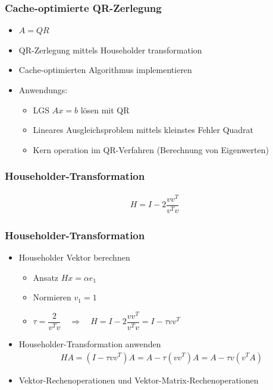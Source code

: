 \begin{frame}
\frametitle{Cache-optimierte QR-Zerlegung}
\vspace{-.6cm}
\begin{itemize}
	\item $ A = QR $
	
	\item QR-Zerlegung mittels Householder transformation
	\item Cache-optimierten Algorithmus implementieren
	\item Anwendungs:
	\begin{itemize}
		\item LGS $ Ax = b $ lösen mit QR
		\item Lineares Ausgleichsproblem mittels kleinstes Fehler Quadrat
		\item Kern operation im QR-Verfahren (Berechnung von Eigenwerten)
	\end{itemize}
\end{itemize}

\end{frame}

\begin{frame}
	\frametitle{Householder-Transformation}
	\vspace{-1cm}
	\begin{align*}
		H = I - 2 \dfrac{vv^T}{v^Tv}
	\end{align*}
	\centering
	\scalebox{.8}{}

\end{frame}

\begin{frame}
	\frametitle{Householder-Transformation}
	\vspace{-1cm}
	\begin{itemize}
	\item Householder Vektor berechnen\\
		\begin{itemize}
			\item Ansatz $ Hx = \alpha e_1 $
			\item Normieren $ v_1 = 1 $
			\item $ \tau = \dfrac{2}{v^Tv} \quad \Longrightarrow \quad H = I - 2 \dfrac{vv^T}{v^Tv} = I - \tau vv^T$
		\end{itemize}
		

	\item  Householder-Transformation anwenden
		\begin{align*} 
		H A =(I - \tau vv^T) A= A - \tau (vv^T )A = A - \tau v(v^TA)
		\end{align*}
	\item  Vektor-Rechenoperationen und Vektor-Matrix-Rechenoperationen
	\end{itemize}
\end{frame}

